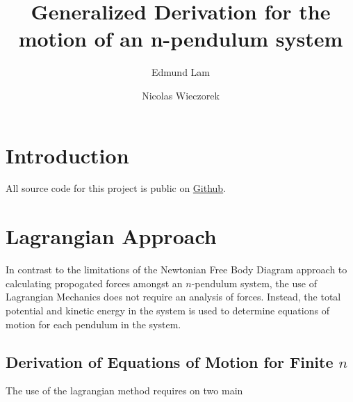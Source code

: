 \documentclass{article}
\title{Generalized Derivation for the motion of an n-pendulum system}
\author{Edmund Lam \and Nicolas Wieczorek}
\begin{document}
\begin{titlepage}
	\maketitle
	\thispagestyle{empty}
\end{titlepage}
\newpage
  \tableofcontents
\newpage

\section{Introduction}
All source code for this project is public on \href{https://github.com/UnsignedByte/n-pendulums}{Github}.

\section{Lagrangian Approach}
In contrast to the limitations of the Newtonian Free Body Diagram approach to calculating propogated forces amongst an $n$-pendulum system, the use of Lagrangian Mechanics does not require an analysis of forces. Instead, the total potential and kinetic energy in the system is used to determine equations of motion for each pendulum in the system.
\subsection{Derivation of Equations of Motion for Finite \texorpdfstring{$n$}{n}}
The use of the lagrangian method requires on two main 
\end{document}
